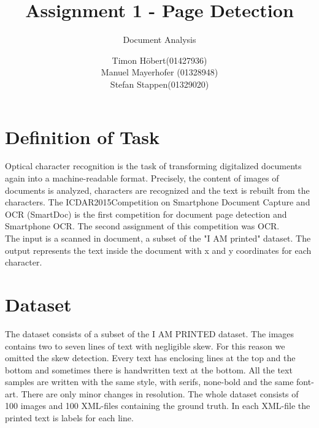 \documentclass[english, paper=a4]{scrartcl}
\begin{document}
\graphicspath{{./images/}}


\title{Assignment 1 - Page Detection} 

\subtitle{Document Analysis} 

\author{Timon Höbert(01427936) \\ Manuel Mayerhofer (01328948)\\ Stefan Stappen(01329020)}




\maketitle



\section{Definition of Task}
Optical character recognition is the task of transforming digitalized documents again into a machine-readable format.
Precisely, the content of images of documents is analyzed, characters are recognized and the text is rebuilt from the characters. The ICDAR2015Competition on Smartphone Document Capture and OCR (SmartDoc) \cite{burie2015icdar2015} is the first competition for document page detection and Smartphone OCR. The second assignment of this competition was OCR.\\
The input is a scanned in document, a subset of the "I AM printed" dataset. The output represents the text inside the document with x and y coordinates for each character.

\section{Dataset}
The dataset consists of a subset of the I AM PRINTED dataset. The images contains two to seven lines of text with negligible
skew. For this reason we omitted the skew detection. Every text has enclosing lines at the top and the bottom
and sometimes there is handwritten text at the bottom.  All the text samples are written with the same style, with serifs,
none-bold and the same font-art. There are only minor changes in resolution.
The whole dataset consists of 100 images and 100 XML-files containing the ground truth. In each XML-file the printed text is labels for each line. 
\end{document}

